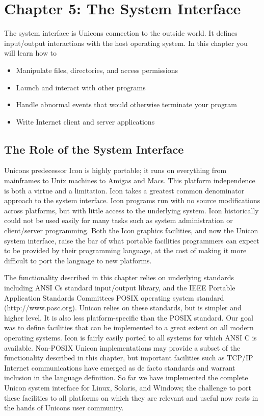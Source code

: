 \clearpage\section{Chapter 5: The System Interface}

The system interface is
Unicon{\textquotesingle}s connection to the outside world. It defines
input/output interactions with the host
operating system. In this chapter you will learn how to

\begin{itemize}
\item Manipulate files, directories, and
access permissions
\item Launch and interact with other programs
\item Handle abnormal events that would otherwise terminate your program
\item Write Internet client and
server applications
\end{itemize}
\subsection{The Role of the System Interface}
Unicon{\textquotesingle}s predecessor Icon is highly portable; it runs
on everything from mainframes to Unix machines to Amigas and Macs. This
platform independence is both a virtue and a limitation. Icon takes a
greatest common denominator approach to the system interface. Icon
programs run with no source modifications across platforms, but with
little access to the underlying system. Icon historically could not be
used easily for many tasks such as system administration or
client/server programming. Both the Icon graphics facilities, and now
the Unicon system interface, {\textquotedbl}raise the
bar{\textquotedbl} of what portable facilities programmers can expect
to be provided by their programming language, at the cost of making it
more difficult to port the language to new platforms.

The functionality described in this chapter relies on underlying
standards including ANSI C{\textquotesingle}s standard input/output
library, and the IEEE Portable Application Standards
Committee{\textquotesingle}s POSIX operating system
standard (http://www.pasc.org). Unicon relies on these standards, but
is simpler and higher level. It is also less platform-specific than the
POSIX standard. Our goal was to define facilities that can be
implemented to a great extent on all modern operating systems. Icon is
fairly easily ported to all systems for which ANSI C is available.
Non-POSIX Unicon implementations may provide a subset of the
functionality described in this chapter, but important facilities such
as TCP/IP Internet communications have emerged as de facto standards
and warrant inclusion in the language definition. So far we have
implemented the complete Unicon system interface for Linux, Solaris,
and Windows; the challenge to port these facilities to all platforms on
which they are relevant and useful now rests in the hands of
Unicon{\textquotesingle}s user community.

